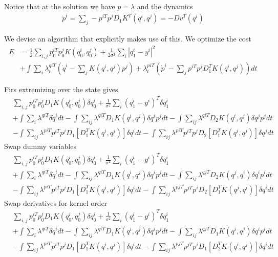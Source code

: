 \documentclass{article}
\begin{document}
Notice that at the solution we have $p = \lambda$ and the dynamics
\begin{align*}
\dot p^i = \sum_j -p^{iT}p^jD_1K^T(q^i,q^j) = -Dv^T(q^i)
\end{align*}

We devise an algorithm that explicitly makes use of this.  We optimize the cost
\begin{align*}
E &= \frac12\sum_{i,j}p_0^{iT}p_0^jK(q^i_0,q^j_0) + \frac{1}{2\sigma^2}\sum_i |q_1^i - y^i|^2 \\
&+ \int\sum_i \lambda^{qiT}_t(\dot q^i - \sum_j K(q^i,q^j)p^j) + \lambda_t^{piT}(\dot p^i - \sum_j p^{iT}p^j D_1^TK(q^i,q^j)) dt
\end{align*}

Firs extremizing over the state gives
\begin{align*}
&\sum_{i,j}p_0^{iT}p_0^{j}D_1 K(q^i_0,q^j_0)\delta q^i_0 + \frac{1}{\sigma^2}\sum_i (q_1^i - y^i)^T \delta q^i_1\\
&+ \int \sum_i \lambda^{qiT} \delta \dot q^i dt - \int \sum_{ij} \lambda^{qiT} D_1K(q^i,q^j)\delta q^ip^j dt - \int \sum_{ij} \lambda^{qiT}D_2 K(q^i,q^j)\delta q^j p^jdt \\
&- \int \sum_{ij} \lambda^{piT} p^{iT}p^j D_1[D_1^T K(q^i,q^j)]\delta q^i dt - \int \sum_{ij} \lambda^{piT}p^{iT}p^j D_2[D_1^T K(q^i,q^j)]\delta q^jdt
\end{align*}
Swap dummy variables
\begin{align*}
&\sum_{i,j}p_0^{iT}p_0^{j}D_1 K(q^i_0,q^j_0)\delta q^i_0 + \frac{1}{\sigma^2}\sum_i (q_1^i - y^i)^T \delta q^i_1\\
&+ \int \sum_i \lambda^{qiT} \delta \dot q^i dt - \int \sum_{ij} \lambda^{qiT} D_1K(q^i,q^j)\delta q^ip^j dt - \int \sum_{ij} \lambda^{qjT}D_2 K(q^j,q^i)\delta q^i p^idt \\
& - \int \sum_{ij} \lambda^{piT} p^{iT}p^j D_1[D_1^T K(q^i,q^j)]\delta q^i dt - \int \sum_{ij} \lambda^{pjT} p^{jT}p^i D_2[D_1^T K(q^j,q^i)]\delta q^idt
\end{align*}
Swap derivatives for kernel order
\begin{align*}
&\sum_{i,j}p_0^{iT}p_0^{j}D_1 K(q^i_0,q^j_0)\delta q^i_0 + \frac{1}{\sigma^2}\sum_i (q_1^i - y^i)^T \delta q^i_1\\
&+ \int \sum_i \lambda^{qiT} \delta \dot q^i dt - \int \sum_{ij} \lambda^{qiT} D_1K(q^i,q^j)\delta q^ip^j dt - \int \sum_{ij} \lambda^{qjT}D_1 K(q^i,q^j)\delta q^i p^idt \\
& - \int \sum_{ij} \lambda^{piT} p^{iT}p^j D_1[D_1^T K(q^i,q^j)]\delta q^i dt - \int \sum_{ij} \lambda^{pjT} p^{jT}p^i D_1[D_2^T K(q^i,q^j)]\delta q^idt
\end{align*}
\end{document}
